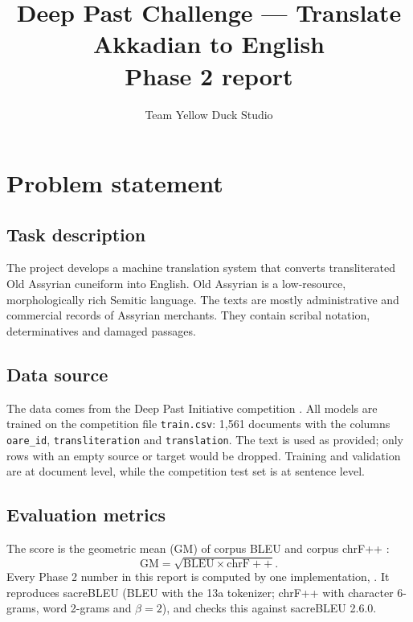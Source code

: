 \documentclass[a4paper,12pt]{article}
\title{Deep Past Challenge --- Translate Akkadian to English\\[4pt]\large Phase 2 report}
\author{Team Yellow Duck Studio}
\date{}
\begin{document}
\maketitle
{\singlespacing\tableofcontents}
\newpage

\section{Problem statement}

\subsection{Task description}
The project develops a machine translation system that converts transliterated Old Assyrian cuneiform into English. Old Assyrian is a low-resource, morphologically rich Semitic language. The texts are mostly administrative and commercial records of Assyrian merchants. They contain scribal notation, determinatives and damaged passages.

\subsection{Data source}
The data comes from the Deep Past Initiative competition \cite{deeppast}. All models are trained on the competition file \texttt{train.csv}: 1{,}561 documents with the columns \texttt{oare\_id}, \texttt{transliteration} and \texttt{translation}. The text is used as provided; only rows with an empty source or target would be dropped. Training and validation are at document level, while the competition test set is at sentence level.

\subsection{Evaluation metrics}
The score is the geometric mean (GM) of corpus BLEU \cite{bleu} and corpus chrF++ \cite{chrfpp}:
\begin{equation}
    \mathrm{GM} = \sqrt{\mathrm{BLEU} \times \mathrm{chrF{+}{+}}}.
\end{equation}
Every Phase 2 number in this report is computed by one implementation, . It reproduces sacreBLEU \cite{sacrebleu} (BLEU with the 13a tokenizer; chrF++ with character 6-grams, word 2-grams and $\beta=2$), and  checks this against sacreBLEU 2.6.0.
\end{document}
